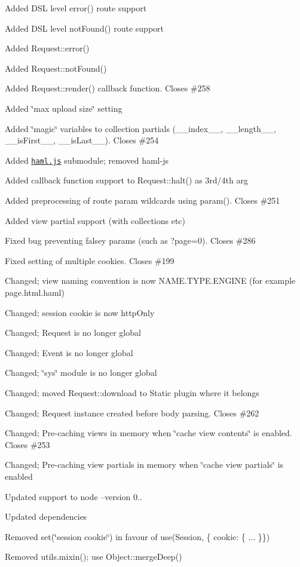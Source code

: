 {\ttfamily 
\begin{DoxyItemize}
\item Added D\+SL level error() route support
\item Added D\+SL level not\+Found() route support
\item Added Request\+::error()
\item Added Request\+::not\+Found()
\item Added Request\+::render() callback function. Closes \#258
\item Added \char`\"{}max upload size\char`\"{} setting
\item Added \char`\"{}magic\char`\"{} variables to collection partials (\+\_\+\+\_\+index\+\_\+\+\_\+, \+\_\+\+\_\+length\+\_\+\+\_\+, \+\_\+\+\_\+is\+First\+\_\+\+\_\+, \+\_\+\+\_\+is\+Last\+\_\+\+\_\+). Closes \#254
\item Added \href{http://github.com/visionmedia/haml.js}{\tt haml.\+js} submodule; removed haml-\/js
\item Added callback function support to Request\+::halt() as 3rd/4th arg
\item Added preprocessing of route param wildcards using param(). Closes \#251
\item Added view partial support (with collections etc)
\item Fixed bug preventing falsey params (such as ?page=0). Closes \#286
\item Fixed setting of multiple cookies. Closes \#199
\item Changed; view naming convention is now N\+A\+M\+E.\+T\+Y\+P\+E.\+E\+N\+G\+I\+NE (for example page.\+html.\+haml)
\item Changed; session cookie is now http\+Only
\item Changed; Request is no longer global
\item Changed; Event is no longer global
\item Changed; \char`\"{}sys\char`\"{} module is no longer global
\item Changed; moved Request\+::download to Static plugin where it belongs
\item Changed; Request instance created before body parsing. Closes \#262
\item Changed; Pre-\/caching views in memory when \char`\"{}cache view contents\char`\"{} is enabled. Closes \#253
\item Changed; Pre-\/caching view partials in memory when \char`\"{}cache view partials\char`\"{} is enabled
\item Updated support to node --version 0..
\item Updated dependencies
\item Removed set(\char`\"{}session cookie\char`\"{}) in favour of use(Session, \{ cookie\+: \{ ... \}\})
\item Removed utils.\+mixin(); use Object\+::merge\+Deep()
\end{DoxyItemize}}

